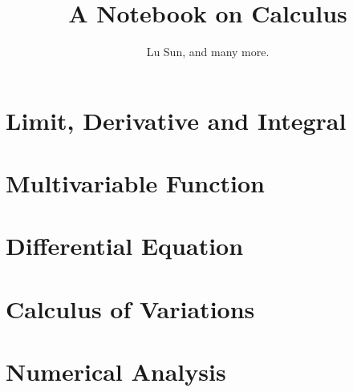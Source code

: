 

\makeindex



\frontmatter

\title{A Notebook on Calculus}
\author{Lu Sun, and many more.}

\maketitle


\tableofcontents


\listoffigures
\listoftables

\mainmatter

\part{Limit, Derivative and Integral}







 

\part{Multivariable Function}







 

\part{Differential Equation}





 

\part{ Calculus of Variations}

 

\part{Numerical Analysis}





 




\printindex


